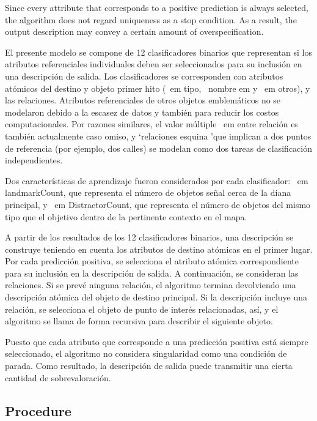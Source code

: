 Since every attribute that corresponds to a positive prediction is always selected, the algorithm does not regard uniqueness as a stop condition. As a result, the output description may convey a certain amount of overspecification.


El presente modelo se compone de 12 clasificadores binarios que representan si los atributos referenciales individuales deben ser seleccionados para su inclusi\'on en una descripci\'on de salida. Los clasificadores se corresponden con atributos at\'omicos del destino y objeto primer hito ({\ em tipo}, {\ nombre em} y {\ em otros}), y las relaciones. Atributos referenciales de otros objetos emblem\'aticos no se modelaron debido a la escasez de datos y tambi\'en para reducir los costos computacionales. Por razones similares, el valor m\'ultiple {\ em entre} relaci\'on es tambi\'en actualmente caso omiso, y `relaciones esquina 'que implican a dos puntos de referencia (por ejemplo, dos calles) se modelan como dos tareas de clasificaci\'on independientes.

Dos caracter\'{i}sticas de aprendizaje fueron considerados por cada clasificador: {\ em landmarkCount}, que representa el n\'umero de objetos se\~nal cerca de la diana principal, y {\ em DistractorCount}, que representa el n\'umero de objetos del mismo tipo que el objetivo dentro de la pertinente contexto en el mapa.

A partir de los resultados de los 12 clasificadores binarios, una descripci\'on se construye teniendo en cuenta los atributos de destino at\'omicas en el primer lugar. Por cada predicci\'on positiva, se selecciona el atributo at\'omica correspondiente para su inclusi\'on en la descripci\'on de salida. A continuaci\'on, se consideran las relaciones. Si se prev\'e ninguna relaci\'on, el algoritmo termina devolviendo una descripci\'on at\'omica del objeto de destino principal. Si la descripci\'on incluye una relaci\'on, se selecciona el objeto de punto de inter\'es relacionadas, as\'{i}, y el algoritmo se llama de forma recursiva para describir el siguiente objeto.

Puesto que cada atributo que corresponde a una predicci\'on positiva est\'a siempre seleccionado, el algoritmo no considera singularidad como una condici\'on de parada. Como resultado, la descripci\'on de salida puede transmitir una cierta cantidad de sobrevaloraci\'on.

\subsection{Procedure}

